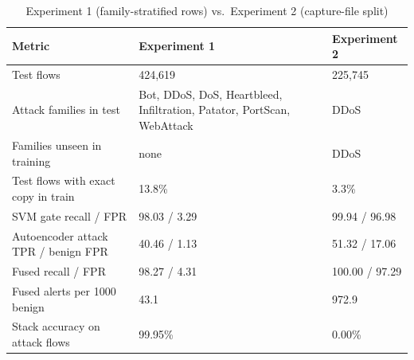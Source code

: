\begin{table}[!htbp]
\centering
\caption{Experiment 1 (family-stratified rows) vs.\ Experiment 2 (capture-file split)}
\label{tab:experiments}
\small
\begin{tabular}{@{}p{4.8cm}p{3.6cm}p{3.6cm}@{}}
\toprule
\textbf{Metric} & \textbf{Experiment 1} & \textbf{Experiment 2} \\
\midrule
Test flows & 424,619 & 225,745 \\
Attack families in test & Bot, DDoS, DoS, Heartbleed, Infiltration, Patator, PortScan, WebAttack & DDoS \\
Families unseen in training & none & DDoS \\
Test flows with exact copy in train & 13.8\% & 3.3\% \\
SVM gate recall / FPR & 98.03 / 3.29 & 99.94 / 96.98 \\
Autoencoder attack TPR / benign FPR & 40.46 / 1.13 & 51.32 / 17.06 \\
Fused recall / FPR & 98.27 / 4.31 & 100.00 / 97.29 \\
Fused alerts per 1000 benign & 43.1 & 972.9 \\
Stack accuracy on attack flows & 99.95\% & 0.00\% \\
\bottomrule
\end{tabular}
\end{table}
